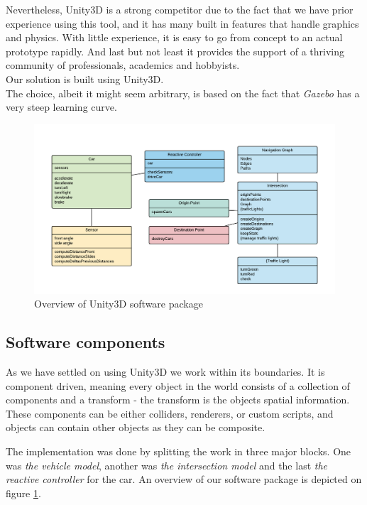 Nevertheless, Unity3D is a strong competitor due to the fact that we have prior experience using this tool, and it has many built in features that handle graphics and physics. 
With little experience, it is easy to go from concept to an actual prototype rapidly.
And last but not least it provides the support of a thriving community of professionals, academics and hobbyists.\\
Our solution is built using Unity3D.\\

The choice, albeit it might seem arbitrary, is based on the fact that \textit{Gazebo} has a very steep learning curve.

\begin{figure}
\centering
\includegraphics[scale=.6]{img/classdiagram}
\caption{Overview of Unity3D software package}
\label{figure:classdiagram}
\end{figure}

\subsection{Software components}
As we have settled on using Unity3D we work within its boundaries.
It is component driven, meaning every object in the world consists of a collection of components and a transform - the transform is the objects spatial information.
These components can be either colliders, renderers, or custom scripts, and objects can contain other objects as they can be composite.

The implementation was done by splitting the work in three major blocks. One was \textit{the vehicle model}, another was \textit{the intersection model} and the last \textit{the reactive controller} for the car.
An overview of our software package is depicted on figure \ref{figure:classdiagram}.

